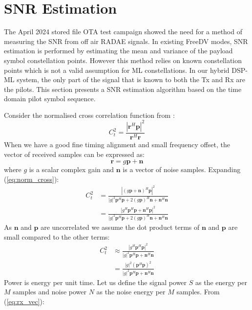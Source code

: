 \documentclass{article}
\begin{document}
\section{SNR Estimation}

The April 2024 stored file OTA test campaign showed the need for a method of measuring the SNR from off air RADAE signals.  In existing FreeDV modes, SNR estimation is performed by estimating the mean and variance of the payload symbol constellation points. However this method relies on known constellation points which is not a valid assumption for ML constellations.  In our hybrid DSP-ML system, the only part of the signal that is known to both the Tx and Rx are the pilots.  This section presents a SNR estimation algorithm based on the time domain pilot symbol sequence.

Consider the normalised cross correlation function from \cite{freedv_low}:
\begin{equation}
\label{eq:norm_cross}
C_t^2 = \frac{|\bm{r}^H\bm{p}|^2}{\bm{r}^H\bm{r}}
\end{equation}
When we have a good fine timing alignment and small frequency offset, the vector of received samples can be expressed as:
\begin{equation}
\label{eq:rx_vec}
\bm{r} = g\bm{p} + \bm{n}
\end{equation}
where $g$ is a scalar complex gain and $\bm{n}$ is a vector of noise samples.  Expanding (\ref{eq:norm_cross}):
\begin{equation}
\label{eq:norm_cross_exp}
\begin{split}
C_t^2 &= \frac{|(g\bm{p}+\bm{n})^H\bm{p}|^2}{|g|^2\bm{p}^H\bm{p} + 2(g\bm{p})^H\bm{n} + \bm{n}^H\bm{n}} \\
      &= \frac{|g^H\bm{p}^H\bm{p} + \bm{n}^H \bm{p}|^2}{|g|^2\bm{p}^H\bm{p} + 2(g\bm{p})^H\bm{n} + \bm{n}^H\bm{n}}
\end{split}
\end{equation}
As $\bm{n}$ and $\bm{p}$ are uncorrelated we assume the dot product terms of $\bm{n}$ and $\bm{p}$ are small compared to the other terms:
\begin{equation}
\label{eq:norm_cross_approx}
\begin{split}
C_t^2 &\approx \frac{|g^H\bm{p}^H\bm{p}|^2}{|g|^2\bm{p}^H\bm{p} + \bm{n}^H\bm{n}} \\
      &= \frac{|g|^2 (\bm{p}^H\bm{p})^2}{|g|^2\bm{p}^H\bm{p} + \bm{n}^H\bm{n}}
\end{split}
\end{equation}
Power is energy per unit time. Let us define the signal power $S$ as the energy per $M$ samples and noise power $N$ as the noise energy per $M$ samples. From (\ref{eq:rx_vec}):
\end{document}
